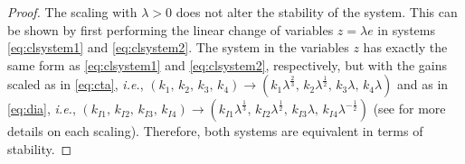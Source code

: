 \documentclass[journal,twoside,web]{ieeecolor}
\begin{document}
\begin{proof}
The scaling with $\lambda>0$ does not alter the stability of the system. This can be shown by first performing the linear change of variables $z=\lambda e$ in systems \eqref{eq:clsystem1} and \eqref{eq:clsystem2}. The system in the variables $z$ has exactly the same form as \eqref{eq:clsystem1} and \eqref{eq:clsystem2}, respectively, but with the gains scaled as in \eqref{eq:cta}, \textit{i.e.}, $\left(k_{1},\,k_{2},\,k_{3},\,k_{4}\right)\rightarrow\left(k_{1}\lambda^{\frac{2}{3}},\,k_{2}\lambda^{\frac{1}{2}},\,k_{3}\lambda,\,k_{4}\lambda\right)$ and as in \eqref{eq:dia}, \textit{i.e.}, $\left(k_{I1},\,k_{I2},\,k_{I3},\,k_{I4}\right)\rightarrow\left(k_{I1}\lambda^{\frac{1}{3}},\,k_{I2}\lambda^{\frac{1}{2}},\,k_{I3}\lambda,\,k_{I4}\lambda^{-\frac{1}{2}}\right)$ (see \cite{b:Torres-Sanchez-Fridman-Moreno,b:Gutierrez-Mercado-Moreno-Fridman-IJRNC2020} for more details on each scaling). Therefore, both systems are equivalent in terms of stability.


\end{proof}
\end{document}
